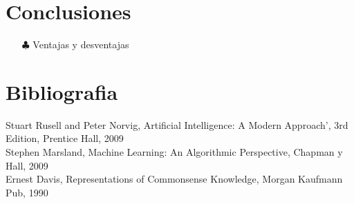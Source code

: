 \documentclass[10pt, a4paper]{article}
\begin{document}
\section{Conclusiones}
\begin{enumerate}
\item[$\clubsuit$]Ventajas y desventajas
\end{enumerate}
\section{Bibliografia}

Stuart Rusell and Peter Norvig, Artificial Intelligence: A Modern Approach', 3rd Edition, Prentice Hall, 2009 \\

Stephen Marsland, Machine Learning: An Algorithmic Perspective, Chapman y Hall, 2009 \\

Ernest Davis, Representations of Commonsense Knowledge, Morgan Kaufmann Pub, 1990 \\
\end{document}
